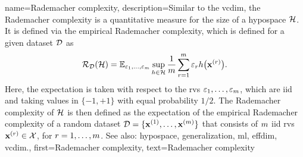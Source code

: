 {name={Rademacher complexity},
 	description={Similar to the \gls{vcdim}, the  Rademacher 
	complexity \cite{bartlett2002rademacher} is a quantitative measure 
	for the size of a \gls{hypospace} $\mathcal{H}$. It is defined via the 
	empirical Rademacher complexity, which is defined for a given \gls{dataset} 
	$\mathcal{D}$ as
	\begin{equation}
    \mathcal{R}_{\mathcal{D}}(\mathcal{H}) 
    = 
    \mathbb{E}_{\varepsilon_{1},\ldots,\varepsilon_{m} } 
	\sup_{h \in \mathcal{H}} \frac{1}{m} \sum_{r=1}^m \varepsilon_r 
	h\big({\bf x}^{(r)} \big).
    \label{eq:def_emprical_rademacher_complexity_hypothesis_dict}
    \end{equation}
	Here, the \gls{expectation} is taken with respect to 
	the \glspl{rv} $\varepsilon_{1},\ldots,\varepsilon_{m}$,
	which are \gls{iid} and taking values in $\{ -1, +1 \}$ with equal 
	\gls{probability} $1/2$. The Rademacher complexity of $\mathcal{H}$ is 
	then defined as the \gls{expectation} of the empirical Rademacher complexity 
	of a random \gls{dataset} $\mathcal{D} = \{{\bf x}^{(1)}, \hdots, {\bf x}^{(m)}\}$
	that consists of $m$ \gls{iid} \glspl{rv} ${\bf x}^{(r)} \in \mathcal{X}$, 
	for $r=1,\ldots,m$.  
        See also: \gls{hypospace},  \gls{generalization}, \gls{ml}, \gls{effdim}, \gls{vcdim}.},
	first={Rademacher complexity},
	text={Rademacher complexity}  
}

